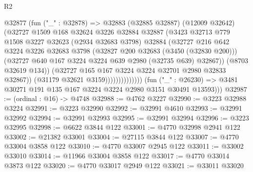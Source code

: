 \begin{lexlean}{R2}
\begin{coremodule}
                              @32877
                                (fun ("_" : @32878) =>
                                @32883
                                  (@32885 @32887)
                                  (@12009 @32642)
                                  (@32727
                                    @1509
                                    @168
                                    @32624
                                    @3226
                                    @32884
                                    @32887
                                    (@3423
                                      @32713
                                      @779
                                      @1508
                                      @3227
                                      @32623
                                      (@2934 @32683 @3798)
                                      @32884
                                      (@32727
                                        @216
                                        @642
                                        @3224
                                        @3226
                                        @32683
                                        @3798
                                        (@32827 @200 @32683 (@3450 (@32830 @200)))
                                        (@32727
                                          @640
                                          @167
                                          @3224
                                          @3224
                                          @639
                                          @2980
                                          (@32735 @639)
                                          @32867))
                                      (@8703 @32619 @134))
                                    (@32727 @165 @167 @3224 @3224 @32701 @2980 @32833 @32867))
                                  (@31179 @32621 @3159))))))))))))))
        (fun ("_" : @26230) => @3481 @30271 @191 @135 @167 @3224 @3224 @2980 @3151 @30491 @13593)))
@32987 := (ordinal : @16) -> @4748
@32988 := @4762 @3227
@32990 := @3223 @32988 @3224
@32991 := @3223 @32990
@32992 := @32991 @4610
@32993 := @32991 @32992
@32994 := @32991 @32993
@32995 := @32991 @32994
@32996 := @3223 @32995
@32998 := @6622 @3844 @122
@33001 := @4770 @32998 @2941 @122
@33002 := @21382 @33001
@33004 := @27115 @3844 @122
@33007 := @4770 @33004 @3858 @122
@33010 := @4770 @33007 @2945 @122
@33011 := @33002 @33010
@33014 := @11966 @33004 @3858 @122
@33017 := @4770 @33014 @3873 @122
@33020 := @4770 @33017 @2949 @122
@33021 := @33011 @33020

\end{coremodule}
\end{lexlean}

